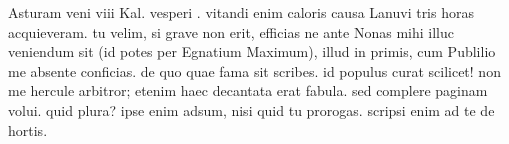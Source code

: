 


 Asturam veni viii Kal. vesperi . vitandi enim caloris causa Lanuvi tris horas acquieveram. tu velim, si grave non erit, efficias ne ante Nonas mihi illuc veniendum sit (id potes per Egnatium Maximum), illud in primis, cum Publilio me absente conficias. de quo quae fama sit scribes. id populus curat scilicet! non me hercule arbitror; etenim haec decantata erat fabula. sed complere paginam volui. quid plura? ipse enim adsum, nisi quid tu prorogas. scripsi enim ad te de hortis.
